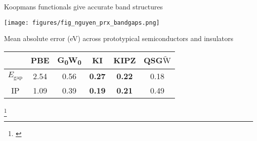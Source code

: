 \documentclass[xcolor=table,aspectratio=169]{beamer}
\newcommand\blfootcite[1]{%
  \begingroup
  \renewcommand\thefootnote{}\footnote{\hspace{-4ex}\cite{#1}}%
  \addtocounter{footnote}{-1}%
  \endgroup
}
\numberwithin{equation}{section}
\begin{document}
\begin{frame}{\normalsize Koopmans functionals give accurate band structures}
   \begin{minipage}[c]{0.35\textwidth}
      \texttt{[image: figures/fig\_nguyen\_prx\_bandgaps.png]}
   \end{minipage}
   \hspace{1em}
   \begin{minipage}[c]{0.6\textwidth}

      \footnotesize
      Mean absolute error (eV) across prototypical semiconductors and insulators

      \vspace{1ex}
      \begin{tabular}{c S[table-format = 2.2] S[table-format = 2.2] >{\color{seaborn_red}\bfseries}S[table-format = 2.2] >{\color{seaborn_red}\bfseries}S[table-format = 2.2] S[table-format = 2.2]}
                          & {PBE} & {G\textsubscript{0}W\textsubscript{0}} & {KI} & {KIPZ} & {QSG$\tilde{\mathrm{W}}$} \\
         \midrule
         \midrule
         $E_\mathrm{gap}$ & 2.54  & 0.56                                   & 0.27 & 0.22   & 0.18                      \\
         \midrule
         IP               & 1.09  & 0.39                                   & 0.19 & 0.21   & 0.49                      \\
      \end{tabular}
   \end{minipage}

   \blfootcite{Nguyen2018}
\end{frame}
\end{document}
